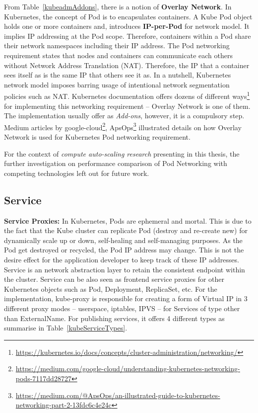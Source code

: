 From Table~\ref{kubeadmAddons}, there is a notion of \textbf{Overlay Network}. In Kubernetes, the concept of Pod is to encapsulates containers. A Kube Pod object holds one or more containers and, introduces \textbf{IP-per-Pod} for network model. It implies IP addressing at the Pod scope. Therefore, containers within a Pod share their network namespaces including their IP address. The Pod networking requirement \parencite{kubeDoc} states that nodes and containers can communicate each others without Network Address Translation (NAT). Therefore, the IP that a container sees itself as is the same IP that others see it as. In a nutshell, Kubernetes network model imposes barring usage of intentional network segmentation policies such as NAT. Kubernetes documentation offers dozens of different ways\footnote{\url{https://kubernetes.io/docs/concepts/cluster-administration/networking/}} for implementing this networking requirement -- Overlay Network is one of them. The implementation usually offer as \emph{Add-ons}, however, it is a compulsory step. Medium articles by google-cloud\footnote{\url{https://medium.com/google-cloud/understanding-kubernetes-networking-pods-7117dd28727}}, ApsOps\footnote{\url{https://medium.com/@ApsOps/an-illustrated-guide-to-kubernetes-networking-part-2-13fdc6c4e24c}} illustrated details on how Overlay Network is used for Kubernetes Pod networking requirement. %

For the context of \emph{compute auto-scaling research} presenting in this thesis, the further investigation on performance comparison of Pod Networking with competing technologies left out for future work.

\subsection{Service}
\label{kubeService}
\noindent \textbf{Service Proxies:} \quad In Kubernetes, Pods are ephemeral and mortal. This is due to the fact that the Kube cluster can replicate Pod (destroy and re-create new) for dynamically scale up or down, self-healing and self-managing purposes. As the Pod get destroyed or recycled, the Pod IP address may change. This is not the desire effect for the application developer to keep track of these IP addresses. Service is an network abstraction layer to retain the consistent endpoint within the cluster. Service can be also seen as frontend service proxies for other Kubernetes objects such as Pod, Deployment, ReplicaSet, etc. For the implementation, kube-proxy is responsible for creating a form of Virtual IP in 3 different proxy modes -- userspace, iptables, IPVS --  for Services of type other than ExternalName. For publishing services, it offers 4 different types as summarise in Table~\ref{kubeServiceTypes}.

